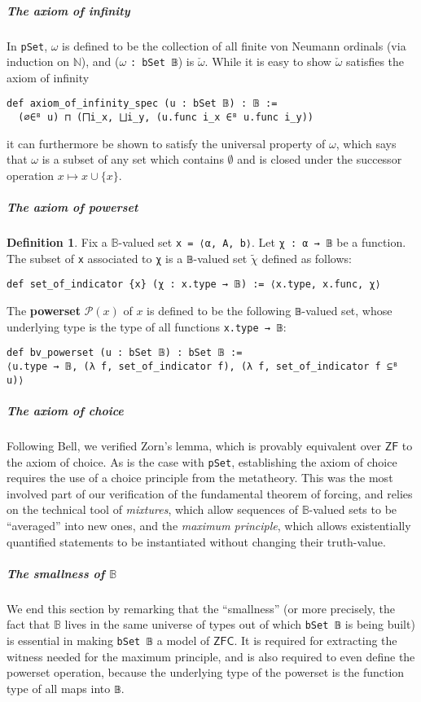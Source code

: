 \documentclass[a4paper,USenglish,cleveref, autoref]{lipics-v2019}
\newcommand{\B}{\mathbb{B}}
\newcommand{\lil}{\lstinline}
\theoremstyle{theorem}
\theoremstyle{definition}
\newtheorem{defn}[definition]{Definition}
\begin{document}
\subparagraph*{The axiom of infinity}
In \lil{pSet}, $\omega$ is defined to be the collection of all finite von Neumann ordinals (via induction on $\mathbb{N}$), and ($\omega$ \lil{: bSet 𝔹}) is $\check{\omega}$. While it is easy to show $\check{\omega}$ satisfies the axiom of infinity
\begin{lstlisting}
def axiom_of_infinity_spec (u : bSet 𝔹) : 𝔹 :=
  (∅∈ᴮ u) ⊓ (⨅i_x, ⨆i_y, (u.func i_x ∈ᴮ u.func i_y))
\end{lstlisting}
it can furthermore be shown to satisfy the universal property of $\omega$, which says that $\omega$ is a subset of any set which contains $\emptyset$ and is closed under the successor operation $x \mapsto x \cup \{x\}$.

\subparagraph*{The axiom of powerset}
\begin{defn} \label{def-powerset}
  Fix a $\B$-valued set \lil{x = ⟨α, A, b⟩}. Let \lil{χ : α → 𝔹} be a function. The subset of \lil{x} associated to \lil{χ} is a \lil{𝔹}-valued set $\widetilde{\chi}$ defined as follows:
\begin{lstlisting}
def set_of_indicator {x} (χ : x.type → 𝔹) := ⟨x.type, x.func, χ⟩
\end{lstlisting}

The \textbf{powerset} $\mathcal{P}(x)$ of $x$ is defined to be the following \lil{𝔹}-valued set, whose underlying type is the type of all functions \lil{x.type → 𝔹}:
\begin{lstlisting}
def bv_powerset (u : bSet 𝔹) : bSet 𝔹 :=
⟨u.type → 𝔹, (λ f, set_of_indicator f), (λ f, set_of_indicator f ⊆ᴮ u)⟩
\end{lstlisting}
\end{defn}

\subparagraph*{The axiom of choice}
Following Bell, we verified Zorn's lemma, which is provably equivalent over $\mathsf{ZF}$ to the axiom of choice. As is the case with \lil{pSet}, establishing the axiom of choice requires the use of a choice principle from the metatheory. This was the most involved part of our verification of the fundamental theorem of forcing, and relies on the technical tool of \emph{mixtures}, which allow sequences of $\B$-valued sets to be ``averaged'' into new ones, and the \emph{maximum principle}, which allows existentially quantified statements to be instantiated without changing their truth-value.

\subparagraph*{The smallness of $\B$}
We end this section by remarking that the ``smallness'' (or more precisely, the fact that $\B$ lives in the same universe of types out of which \lil{bSet 𝔹} is being built) is essential in making \lstinline{bSet 𝔹} a model of $\mathsf{ZFC}$. It is required for extracting the witness needed for the maximum principle, and is also required to even define the powerset operation, because the underlying type of the powerset is the function type of all maps into \lstinline{𝔹}.
\end{document}
